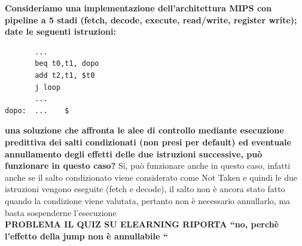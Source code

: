 \documentclass[a4paper,12pt, oneside]{book}
\begin{document}
\begin{esercizio}
  \textbf{Consideriamo una implementazione dell'architettura MIPS
    con pipeline a 5 stadi (fetch, decode, execute, read/write,
    register write); date le seguenti istruzioni:}
\begin{verbatim}
       ...
       beq t0,t1, dopo
       add t2,t1, $t0
       j loop
       ...
dopo:  ...    $
\end{verbatim}
  \textbf{una soluzione che affronta le alee di controllo mediante
    esecuzione predittiva dei salti condizionati (non presi per
    default) ed eventuale annullamento degli effetti delle due
    istruzioni successive, può funzionare in questo caso?}
  Si, può funzionare anche in questo caso, infatti anche se il
  salto condizionato viene considerato come Not Taken e quindi
  le due istruzioni vengono eseguite (fetch e decode), il salto
  non è ancora stato fatto quando la condizione viene valutata,
  pertanto non è necessario annullarlo, ma basta sospenderne
  l'esecuzione\\
  \textbf{PROBLEMA IL QUIZ SU ELEARNING RIPORTA ``no, perchè l'effetto
    della jump non è annullabile ``}
\end{esercizio}
\end{document}
